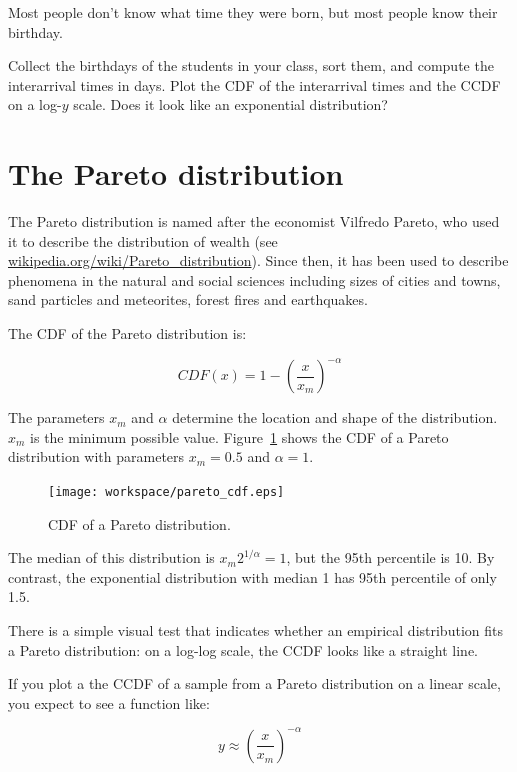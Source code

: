 \documentclass[12pt]{book}
\begin{document}
\begin{ex}

Most people don't know what time they were born, but most people know
their birthday.

Collect the birthdays of the students in your class, sort them, and
compute the interarrival times in days.  Plot the CDF of the interarrival
times and the CCDF on a log-$y$ scale.  Does it look like
an exponential distribution?

\end{ex}


\section{The Pareto distribution}

The Pareto distribution is named after the economist Vilfredo Pareto,
who used it to describe the distribution of wealth (see
\url{wikipedia.org/wiki/Pareto_distribution}).  Since then, it has
been used to describe phenomena in the natural and social
sciences including sizes of cities and towns, sand particles and
meteorites, forest fires and earthquakes.

The CDF of the Pareto distribution is:

\[ CDF(x) = 1- \left( \frac{x}{x_m} \right) ^{-\alpha} \]

The parameters $x_m$ and $\alpha$ determine the location and shape of
the distribution.  $x_m$ is the minimum possible value.
Figure~\ref{pareto_cdf} shows the CDF of a Pareto distribution with
parameters $x_m = 0.5$ and $\alpha = 1$.

\begin{figure}
\centerline{\texttt{[image: workspace/pareto\_cdf.eps]}}
\caption{CDF of a Pareto distribution.}
\label{pareto_cdf}
\end{figure}

The median of this distribution is $x_m 2^{1/\alpha} = 1$, but the
95th percentile is 10.  By contrast, the exponential distribution
with median 1 has 95th percentile of only 1.5.

There is a simple visual test that indicates whether an empirical
distribution fits a Pareto distribution: on a log-log scale, the CCDF
looks like a straight line.

If you plot a the CCDF of a sample from a Pareto distribution on a
linear scale, you expect to see a function like:

\[ y \approx \left( \frac{x}{x_m} \right) ^{-\alpha} \]
\end{document}
